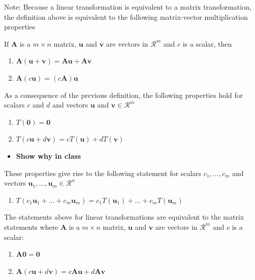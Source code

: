\documentclass[
]{book}
\providecommand{\tightlist}{%
  \setlength{\itemsep}{0pt}\setlength{\parskip}{0pt}}
\theoremstyle{definition}
\theoremstyle{definition}
\theoremstyle{definition}
\theoremstyle{remark}
\begin{document}
Note: Because a linear transformation is equivalent to a matrix transformation, the definition above is equivalent to the following matrix-vector multiplication properties

If \(\mathbf{A}\) is a \(m \times n\) matrix, \(\mathbf{u}\) and \(\mathbf{v}\) are vectors in \(\mathcal{R}^m\) and \(c\) is a scalar, then

\begin{enumerate}
\def\labelenumi{\arabic{enumi})}
\tightlist
\item
  \(\mathbf{A} (\mathbf{u} + \mathbf{v}) = \mathbf{A} \mathbf{u} + \mathbf{A} \mathbf{v}\)
\item
  \(\mathbf{A} (c \mathbf{u}) = (c \mathbf{A}) \mathbf{u}\)
\end{enumerate}

As a consequence of the previous definition, the following properties hold for scalars \(c\) and \(d\) and vectors \(\mathbf{u}\) and \(\mathbf{v} \in \mathcal{R}^m\)

\begin{enumerate}
\def\labelenumi{\arabic{enumi})}
\setcounter{enumi}{2}
\tightlist
\item
  \(T(\mathbf{0}) = \mathbf{0}\)
\item
  \(T(c \mathbf{u} + d \mathbf{v}) = c T(\mathbf{u}) + d T(\mathbf{v})\)
\end{enumerate}

\begin{itemize}
\tightlist
\item
  \textbf{Show why in class}
\end{itemize}

These properties give rise to the following statement for scalars \(c_1, \ldots, c_m\) and vectors \(\mathbf{u}_1, \ldots, \mathbf{u}_m \in \mathcal{R}^n\)

\begin{enumerate}
\def\labelenumi{\arabic{enumi})}
\setcounter{enumi}{4}
\tightlist
\item
  \(T(c_1 \mathbf{u}_1 + \ldots + c_m \mathbf{u}_m) = c_1 T(\mathbf{u}_1) + \ldots + c_m T(\mathbf{u}_m)\)
\end{enumerate}

The statements above for linear transformations are equivalent to the matrix statements where \(\mathbf{A}\) is a \(m \times n\) matrix, \(\mathbf{u}\) and \(\mathbf{v}\) are vectors in \(\mathcal{R}^m\) and \(c\) is a scalar:

\begin{enumerate}
\def\labelenumi{\arabic{enumi})}
\setcounter{enumi}{2}
\tightlist
\item
  \(\mathbf{A} \mathbf{0} = \mathbf{0}\)
\item
  \(\mathbf{A}(c \mathbf{u} + d \mathbf{v}) = c \mathbf{A} \mathbf{u} + d \mathbf{A} \mathbf{v}\)
\end{enumerate}
\end{document}
